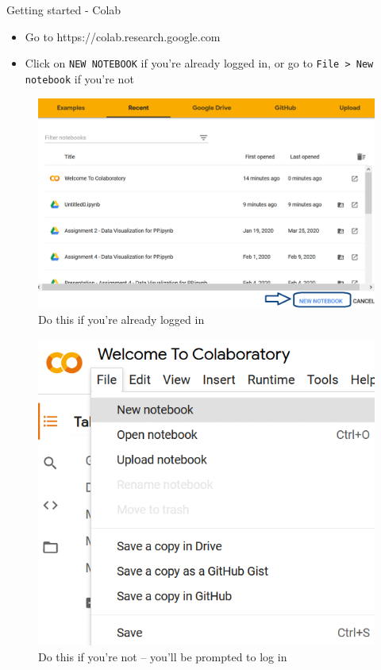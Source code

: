 \documentclass[aspectratio=169]{beamer}
\begin{document}
\begin{frame}{Getting started - Colab}

	\begin{itemize}
		\item Go to https://colab.research.google.com
		\item Click on \texttt{NEW NOTEBOOK} if you're already logged in, or go to \texttt{File > New notebook} if you're not
	\end{itemize}

	\begin{multicols}{2}

		\begin{figure}
			\centering
			\includegraphics[width=0.9\linewidth]{img/new_nb_logged_in.png}
			\caption{Do this if you're already logged in}
		\end{figure}
		\begin{figure}
			\centering
			\includegraphics[width=0.6\linewidth]{img/new_nb_not_logged_in.png}
			\caption{Do this if you're not -- you'll be prompted to log in}
		\end{figure}

	\end{multicols}

\end{frame}
\end{document}
